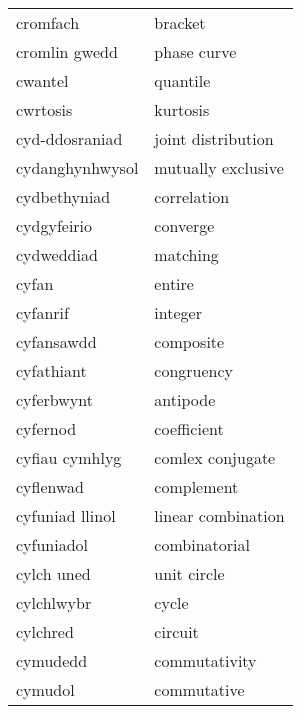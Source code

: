\begin{supertabular}{p{0.22\textwidth}p{0.22\textwidth}}
                        cromfach &                           bracket \\
                   cromlin gwedd &                       phase curve \\
                         cwantel &                          quantile \\
                        cwrtosis &                          kurtosis \\
                  cyd-ddosraniad &                joint distribution \\
                 cydanghynhwysol &                mutually exclusive \\
                    cydbethyniad &                       correlation \\
                     cydgyfeirio &                          converge \\
                      cydweddiad &                          matching \\
                           cyfan &                            entire \\
                        cyfanrif &                           integer \\
                      cyfansawdd &                         composite \\
                      cyfathiant &                        congruency \\
                      cyferbwynt &                          antipode \\
                        cyfernod &                       coefficient \\
                  cyfiau cymhlyg &                  comlex conjugate \\
                       cyflenwad &                        complement \\
                 cyfuniad llinol &                linear combination \\
                      cyfuniadol &                     combinatorial \\
                      cylch uned &                       unit circle \\
                      cylchlwybr &                             cycle \\
                        cylchred &                           circuit \\
                        cymudedd &                     commutativity \\
                         cymudol &                       commutative \\

\end{supertabular}
